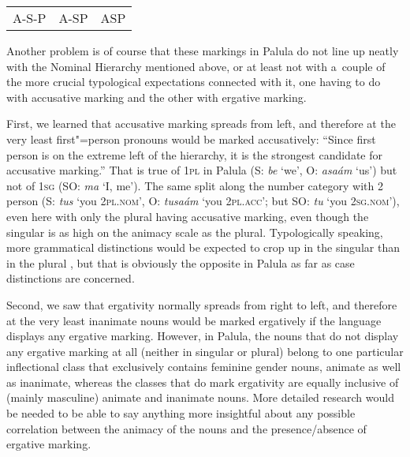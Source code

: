 \begin{table}[H]
\begin{tabularx}{\textwidth}{ C C C }
\hline
\dagrcell{~} &
\ligrcell{~} &\\\hline
 A-S-P &
 A-SP &
 ASP\\
\end{tabularx}
\end{table}


Another problem is of course that these markings in Palula do not line up neatly with the Nominal Hierarchy mentioned above, or at least not with a~couple of the more crucial typological expectations connected with it, one having to do with accusative marking and the other with ergative marking. 



First, we learned that accusative marking spreads from left, and therefore at the very least
first"=person pronouns would be marked accusatively: ``Since first person is on the extreme left of
the hierarchy, it is the strongest candidate for accusative marking.'' \citep[89]{dixon1994} That is true
of \textsc{1pl} in Palula (S: \textit{be} `we', O: \textit{asaám} `us') but not of \textsc{1sg} (SO:
\textit{ma} `I, me'). The same split along the number category with 2 person (S: \textit{tus} `you 2\textsc{pl.nom}', O: \textit{tusaám} `you 2\textsc{pl.acc}'; but SO: \textit{tu} `you 2\textsc{sg.nom}'), even here with only the plural having accusative marking, even though the singular is as high on the animacy scale as the plural. Typologically speaking, more grammatical distinctions would be expected to crop up in the singular than in the plural \citep[92]{dixon1994}, but that is obviously the opposite in Palula as far as case distinctions are concerned. 



Second, we saw that ergativity normally spreads from right to left, and therefore at the very least inanimate nouns would be marked ergatively if the language displays any ergative marking. However, in Palula, the nouns that do not display any ergative marking at all (neither in singular or plural) belong to one particular inflectional class that exclusively contains feminine gender nouns, animate as well as inanimate, whereas the classes that do mark ergativity are equally inclusive of (mainly masculine) animate and inanimate nouns. More detailed research would be needed to be able to say anything more insightful about any possible correlation between the animacy of the nouns and the presence/absence of ergative marking. 



